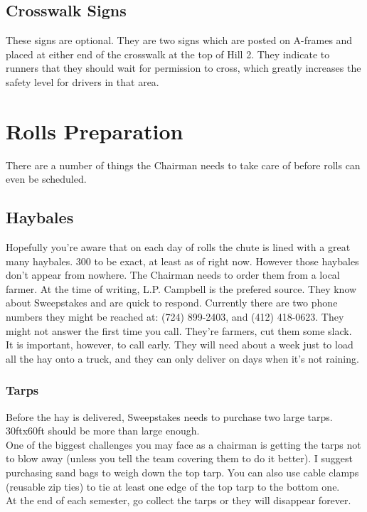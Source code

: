 \subsection{Crosswalk Signs}
These signs are optional. They are two signs which are posted on A-frames and
placed at either end of the crosswalk at the top of Hill 2. They indicate to
runners that they should wait for permission to cross, which greatly increases
the safety level for drivers in that area.


\section{Rolls Preparation}
\label{sec:ChairRollsPrep}
There are a number of things the Chairman needs to take care of before rolls
can even be scheduled.

\subsection{Haybales}
Hopefully you're aware that on each day of rolls the chute is lined with a
great many haybales. 300 to be exact, at least as of right now. However
those haybales don't appear from nowhere. The Chairman needs to order them
from a local farmer. At the time of writing, L.P. Campbell is the prefered
source. They know about Sweepstakes and are quick to respond. Currently there
are two phone numbers they might be reached at: (724) 899-2403, and
(412) 418-0623. They might not answer the first time you call. They're
farmers, cut them some slack.
\\
It is important, however, to call early. They will need about a week just
to load all the hay onto a truck, and they can only deliver on days when
it's not raining.

\subsubsection{Tarps}
Before the hay is delivered, Sweepstakes needs to purchase two large tarps.
30ftx60ft should be more than large enough.
\\
One of the biggest challenges you may face as a chairman is getting the tarps
not to blow away (unless you tell the team covering them to do it better).
I suggest purchasing sand bags to weigh down the top tarp. You can also use
cable clamps (reusable zip ties) to tie at least one edge of the top tarp
to the bottom one.
\\
At the end of each semester, go collect the tarps or they will disappear
forever.

